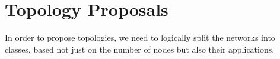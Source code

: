 \section{Topology Proposals}
In order to propose topologies, we need to logically split the networks into
classes, based not just on the number of nodes but also their applications.

